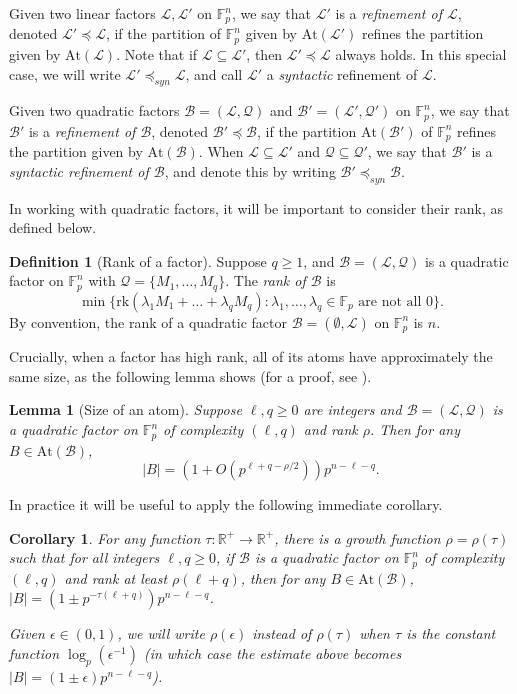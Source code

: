\documentclass[12pt,oneside,british,a4wide]{amsart}
\newtheorem{lemma}[theorem]{Lemma}
\newtheorem{corollary}[theorem]{Corollary}
\numberwithin{equation}{section}
\theoremstyle{definition}
\newtheorem{definition}[theorem]{Definition}
\def\R{\mathbb{R}}
\def\F{\mathbb{F}}
\def\e{\epsilon}
\newcommand{\calL}{\mathcal{L}}
\newcommand{\calB}{\mathcal{B}}
\newcommand{\calQ}{\mathcal{Q}}
\newcommand{\At}{{\mathrm{At}}}
\newcommand{\rk}{{\mathrm{rk}}}
\begin{document}
Given two linear factors $\calL,\calL'$ on $\F_p^n$, we say that $\calL'$ is a \emph{refinement of $\calL$}, denoted $\calL'\preceq \calL$, if the partition of $\F_p^n$ given by  $\At(\calL')$ refines the partition given by $\At(\calL)$.  Note that if $\calL\subseteq \calL'$, then $\calL'\preceq \calL$  always holds.  In this special case, we will write $\calL'\preceq_{syn}\calL$, and call $\calL'$ a \emph{syntactic} refinement of $\calL$.

Given two quadratic factors $\calB=(\calL,\calQ)$ and $\calB'=(\calL',\calQ')$ on $\F_p^n$, we say that $\calB'$ is a \emph{refinement of $\calB$}, denoted $\calB'\preceq \calB$, if the partition $\At(\calB')$ of $\F_p^n$ refines the partition given by $\At(\calB)$.  When $\calL\subseteq \calL'$ and $\calQ\subseteq \calQ'$, we say that $\calB'$ is a \emph{syntactic refinement of $\calB$}, and denote this by writing $\calB'\preceq_{syn}\calB$.

In working with quadratic factors, it will be important to consider their rank, as defined below.

\begin{definition}[Rank of a factor]\label{def:rankfac}
Suppose $q\geq 1$, and $\calB=(\calL,\calQ)$ is a quadratic factor on $\F_p^n$ with  $\calQ=\{M_1,\ldots, M_q\}$.  The \emph{rank of $\calB$} is 
$$
\min\{\rk(\lambda_1M_1+\ldots+\lambda_qM_q): \lambda_1,\ldots, \lambda_q\in \F_p\text{ are not all }0\}.
$$
By convention, the rank of a quadratic factor $\calB=(\emptyset, \calL)$ on $\F_p^n$ is $n$.
\end{definition}

 Crucially, when a factor has high rank, all of its atoms have approximately the same size, as the following lemma shows (for a proof, see \cite{Green.2007}).

\begin{lemma}[Size of an atom]\label{lem:sizeofatoms}
Suppose $\ell,q\geq 0$ are integers and $\calB=(\calL,\calQ)$ is a quadratic factor on $\mathbb{F}_p^n$ of complexity $(\ell,q)$ and rank $\rho$.  Then for any $B\in \At(\calB)$,  
\[|B|=(1+O(p^{\ell+q-\rho/2}))p^{n-\ell-q}.\]
\end{lemma}

In practice it will be useful to apply the following immediate corollary. 

\begin{corollary}\label{cor:sizeofatoms}
For any function $\tau:\mathbb{\R}^+\rightarrow \mathbb{R}^+$, there is a growth function $\rho=\rho(\tau)$ such that for all integers $\ell,q\geq 0$, if $\calB$ is a quadratic factor on $\mathbb{F}_p^n$ of complexity $(\ell,q)$ and rank at least $\rho(\ell+q)$, then for any $B\in \At(\calB)$, $|B|=(1\pm p^{-\tau(\ell+q)})p^{n-\ell-q}$.

Given $\e\in (0,1)$, we will write $\rho(\e)$ instead of $\rho(\tau)$ when $\tau$ is the constant function $\log_p(\e^{-1})$ (in which case the estimate above becomes $|B|=(1\pm\e )p^{n-\ell-q}$). 
\end{corollary}
\end{document}
